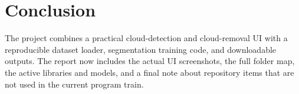 \documentclass[11pt,a4paper]{article}
\begin{document}
\section{Conclusion}
The project combines a practical cloud-detection and cloud-removal UI with a reproducible dataset loader, segmentation training code, and downloadable outputs. The report now includes the actual UI screenshots, the full folder map, the active libraries and models, and a final note about repository items that are not used in the current program train.
\end{document}
